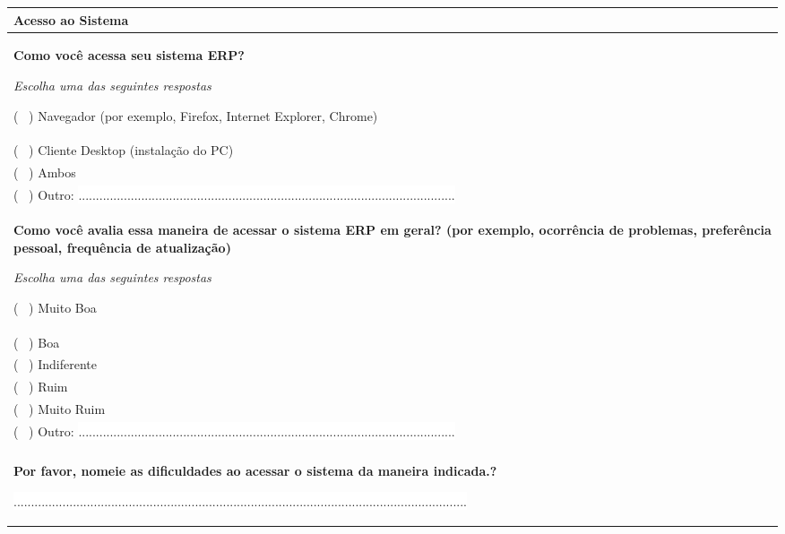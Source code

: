 \noindent  \begin{longtable}{|p{15.7cm}|}
	\hline
	\tabitem \textbf{Acesso ao Sistema} \\
	\hline
	\begin{Spacing}{0.8} 
	\textbf{Como você acessa seu sistema ERP?} \end{Spacing} 
	\begin{Spacing}{2.0} 
		\tiny \textit{Escolha uma das seguintes respostas} \end{Spacing} 
	( \ ) Navegador (por exemplo, Firefox, Internet Explorer, Chrome) \\
	( \ ) Cliente Desktop (instalação do PC)\\
	( \ ) Ambos \\
	( \ ) Outro: \colorbox{white}{ ............................................................................................................ } \\
	\begin{Spacing}{0.8} \end{Spacing}
	\begin{Spacing}{0.8} 
	\textbf{Como você avalia essa maneira de acessar o sistema ERP em geral? (por exemplo, ocorrência de problemas, preferência pessoal, frequência de atualização)} \end{Spacing} 
	\begin{Spacing}{2.0} 
		\tiny \textit{Escolha uma das seguintes respostas} \end{Spacing} 
	( \ ) Muito Boa \\
	( \ ) Boa \\
	( \ ) Indiferente \\
	( \ ) Ruim \\
	( \ ) Muito Ruim \\
	( \ ) Outro: \colorbox{white}{ ............................................................................................................ } \\
	\\
	\begin{Spacing}{0.8} \end{Spacing}
	\begin{Spacing}{0.8} 
		\textbf{Por favor, nomeie as dificuldades ao acessar o sistema da maneira indicada.?} \end{Spacing} 
	\begin{Spacing}{2.0} 
		\tiny \textit{} \end{Spacing} 
	\colorbox{white}{ .................................................................................................................................. } \\

\end{longtable}
